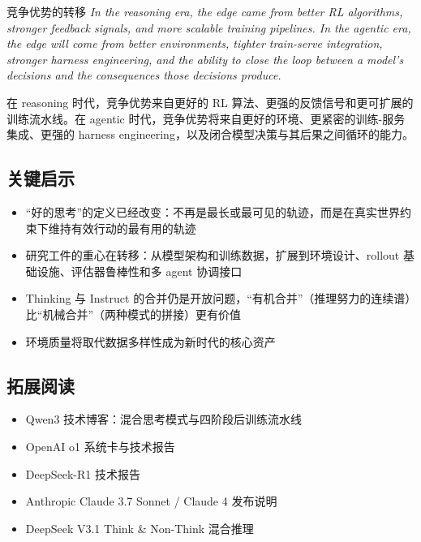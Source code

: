 \documentclass[a4paper]{article}
\begin{document}
\begin{importantbox}{竞争优势的转移}
\textit{In the reasoning era, the edge came from better RL algorithms, stronger feedback signals, and more scalable training pipelines. In the agentic era, the edge will come from better environments, tighter train-serve integration, stronger harness engineering, and the ability to close the loop between a model's decisions and the consequences those decisions produce.}

在 reasoning 时代，竞争优势来自更好的 RL 算法、更强的反馈信号和更可扩展的训练流水线。在 agentic 时代，竞争优势将来自更好的环境、更紧密的训练-服务集成、更强的 harness engineering，以及闭合模型决策与其后果之间循环的能力。
\end{importantbox}

\subsection{关键启示}

\begin{itemize}
    \item ``好的思考''的定义已经改变：不再是最长或最可见的轨迹，而是在真实世界约束下维持有效行动的最有用的轨迹
    \item 研究工件的重心在转移：从模型架构和训练数据，扩展到环境设计、rollout 基础设施、评估器鲁棒性和多 agent 协调接口
    \item Thinking 与 Instruct 的合并仍是开放问题，``有机合并''（推理努力的连续谱）比``机械合并''（两种模式的拼接）更有价值
    \item 环境质量将取代数据多样性成为新时代的核心资产
\end{itemize}

\subsection{拓展阅读}

\begin{itemize}
    \item Qwen3 技术博客：混合思考模式与四阶段后训练流水线
    \item OpenAI o1 系统卡与技术报告
    \item DeepSeek-R1 技术报告
    \item Anthropic Claude 3.7 Sonnet / Claude 4 发布说明
    \item DeepSeek V3.1 Think \& Non-Think 混合推理
\end{itemize}

\end{document}

